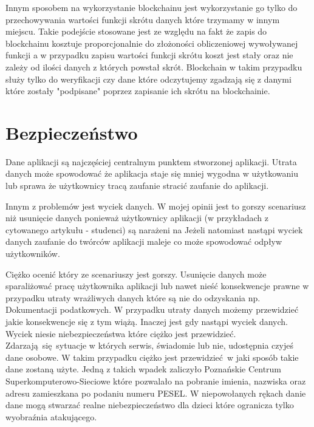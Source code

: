 \documentclass[]{llncs}
\begin{document}
  Innym sposobem na wykorzystanie blockchainu jest wykorzystanie go tylko do
  przechowywania wartości funkcji skrótu danych które trzymamy w innym miejscu.
  Takie podejście stosowane jest ze względu na fakt że zapis do blockchainu
  kosztuje proporcjonalnie do złożoności obliczeniowej wywoływanej funkcji a w
  przypadku zapisu wartości funkcji skrótu koszt jest stały oraz nie zależy od
  ilości danych z których powstał skrót. Blockchain w takim przypadku służy
  tylko do weryfikacji czy dane które odczytujemy zgadzają się z danymi które
  zostały "podpisane" poprzez zapisanie ich skrótu na blockchainie.

\section{Bezpieczeństwo}

  Dane aplikacji są najczęściej centralnym punktem stworzonej aplikacji. Utrata
  danych może spowodować że aplikacja staje się mniej wygodna w
  użytkowaniu\cite{teatr-wspolczesny-utrata-danych} lub sprawa że użytkownicy
  tracą zaufanie stracić zaufanie do aplikacji\cite{nazwa-pl-utrata-danych}.

  Innym z problemów jest wyciek danych\cite{wyciek-danych-studentow}. W mojej
  opinii jest to gorszy scenariusz niż usunięcie danych ponieważ użytkownicy
  aplikacji (w przykładach z cytowanego artykułu - studenci) są narażeni na
  Jeżeli natomiast nastąpi wyciek danych zaufanie do twórców aplikacji maleje co
  może spowodować odpływ użytkowników.

  Ciężko ocenić który ze scenariuszy jest gorszy. Usunięcie danych może
  sparaliżować pracę użytkownika aplikacji lub nawet nieść konsekwencje prawne w
  przypadku utraty wrażliwych danych które są nie do odzyskania np. Dokumentacji
  podatkowych\cite{utrata-dokumentacji}. W przypadku utraty danych możemy
  przewidzieć jakie konsekwencje się z tym wiążą. Inaczej jest gdy nastąpi
  wyciek danych. Wyciek niesie niebezpieczeństwa które ciężko jest przewidzieć.
  Zdarzają się sytuacje w których serwis, świadomie lub nie, udostępnia czyjeś
  dane osobowe. W takim przypadku ciężko jest przewidzieć w jaki sposób takie
  dane zostaną użyte. Jedną z takich wpadek zaliczyło Poznańskie Centrum
  Superkomputerowo-Sieciowe które pozwalało na pobranie imienia, nazwiska oraz
  adresu zamieszkana po podaniu numeru PESEL\cite{dane-dzieci}. W niepowołanych
  rękach danie dane mogą stwarzać realne niebezpieczeństwo dla dzieci które
  ogranicza tylko wyobraźnia atakującego.
\end{document}

